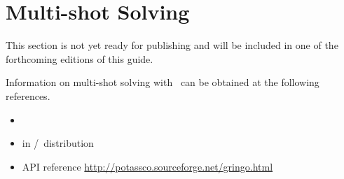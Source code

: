 \section{Multi-shot Solving}\label{sec:multi}

This section is not yet ready for publishing
and will be included in one of the forthcoming editions of this guide.

Information on multi-shot solving with \clingo\ can be obtained at the following references.

\begin{itemize}
\item \cite{gekakasc14b,gekaobsc15a}
\item {} in \gringo/\clingo\ distribution
\item API reference \url{http://potassco.sourceforge.net/gringo.html}
\end{itemize}

